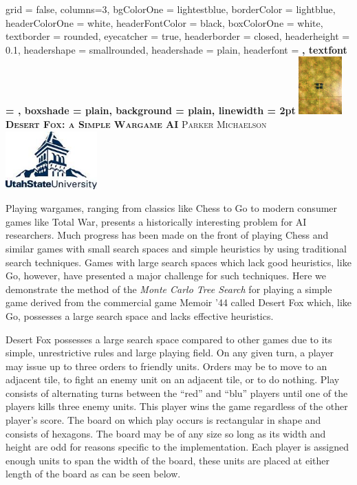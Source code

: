 \documentclass[landscape,final,a0paper,10pt]{baposter}
\begin{document}
\begin{poster}
{
	grid = false,
	columns=3,
	bgColorOne = lightestblue,
	borderColor = lightblue,
	headerColorOne = white,
	headerFontColor = black,
	boxColorOne = white,
	textborder = rounded,
	eyecatcher = true,
	headerborder = closed,
	headerheight = 0.1\textheight,
	headershape = smallrounded,
	headershade = plain,
	headerfont =  \Large\bf\textsc,
	textfont = {\setlength{\parindent}{1.5em}},
	boxshade = plain,
	background = plain,
	linewidth = 2pt
}
{\includegraphics[height=6em]{../images/board_1}}
{\bf\textsc{Desert Fox: a Simple Wargame AI}\vspace{0.5em}}
{\textsc{Parker Michaelson}}
{\includegraphics[height=6em]{../images/logo}}

{
Playing wargames, ranging from classics like Chess to Go to modern consumer games like Total War, presents a historically interesting problem for AI researchers.
Much progress has been made on the front of playing Chess and similar games with small search spaces and simple heuristics by using traditional search techniques.
Games with large search spaces which lack good heuristics, like Go, however, have presented a major challenge for such techniques.
Here we demonstrate the method of the {\it Monte Carlo Tree Search} for playing a simple game derived from the commercial game Memoir '44 called Desert Fox which, like Go, possesses a large search space and lacks effective heuristics.
}

{
Desert Fox possesses a large search space compared to other games due to its simple, unrestrictive rules and large playing field.
On any given turn, a player may issue up to three orders to friendly units.
Orders may be to move to an adjacent tile, to fight an enemy unit on an adjacent tile, or to do nothing.
Play consists of alternating turns between the ``red'' and ``blu'' players until one of the players kills three enemy units.
This player wins the game regardless of the other player's score.
The board on which play occurs is rectangular in shape and consists of hexagons.
The board may be of any size so long as its width and height are odd for reasons specific to the implementation.
Each player is assigned enough units to span the width of the board, these units are placed at either length of the board as can be seen below.

}
\end{poster}
\end{document}
